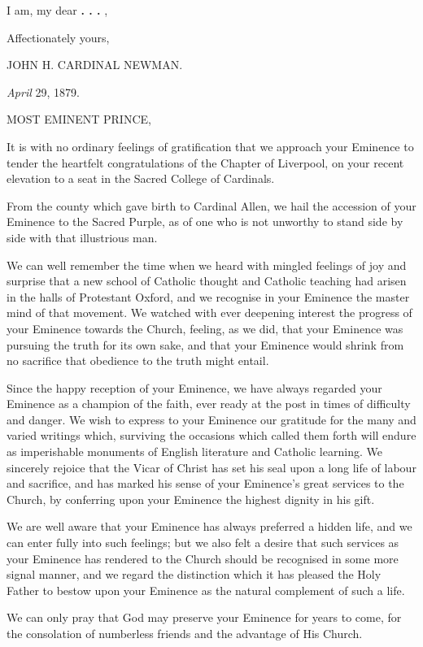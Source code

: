 I am, my dear \textbf{. . .} ,

Affectionately yours,

JOHN H. CARDINAL NEWMAN.


\emph{April} 29, 1879.

MOST EMINENT PRINCE,

It is with no ordinary feelings of gratification that we approach your
Eminence to tender the heartfelt congratulations of the Chapter of
Liverpool, on your recent elevation to a seat in the Sacred
College of Cardinals.

From the county which gave birth to Cardinal Allen, we hail the
accession of your Eminence to the Sacred Purple, as of one who is not
unworthy to stand side by side with that illustrious man.

We can well remember the time when we heard with mingled feelings
of joy and surprise that a new school of Catholic thought and Catholic
teaching had arisen in the halls of Protestant Oxford, and we
recognise in your Eminence the master mind of that movement. We
watched with ever deepening interest the progress of your Eminence
towards the Church, feeling, as we did, that your Eminence was
pursuing the truth for its own sake, and that your Eminence would
shrink from no sacrifice that obedience to the truth might entail.

Since the happy reception of your Eminence, we have always regarded
your Eminence as a champion of the faith, ever ready at the post in
times of difficulty and danger. We wish to express to your Eminence
our gratitude for the many and varied writings which, surviving the
occasions which called them forth will endure as imperishable
monuments of English literature and Catholic learning. We sincerely
rejoice that the Vicar of Christ has set his seal upon a long life of
labour and sacrifice, and has marked his sense of your Eminence's great services to the Church, by conferring upon your Eminence the
highest dignity in his gift.

We are well aware that your Eminence has always preferred a hidden
life, and we can enter fully into such feelings; but we also felt a
desire that such services as your Eminence has rendered to the Church
should be recognised in some more signal manner, and we regard the
distinction which it has pleased the Holy Father to bestow upon your
Eminence as the natural complement of such a life.

We can only pray that God may preserve your Eminence for years to
come, for the consolation of numberless friends and the advantage of
His Church.

